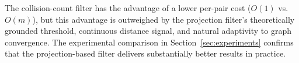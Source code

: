 The collision-count filter has the advantage of a lower per-pair cost ($O(1)$ vs.\ $O(m)$), but this advantage is outweighed by the projection filter's theoretically grounded threshold, continuous distance signal, and natural adaptivity to graph convergence.
The experimental comparison in Section~\ref{sec:experiments} confirms that the projection-based filter delivers substantially better results in practice.
